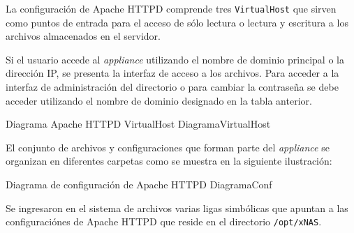 La configuraci\'{o}n de Apache \textsc{HTTPD} comprende tres \texttt{VirtualHost} que sirven como puntos de entrada para el acceso de s\'{o}lo lectura o lectura y escritura a los archivos almacenados en el servidor.

{
 \begin{table}[H]
 \caption{VirtualHost configurados en Apache \textsc{HTTPD}}{}
 \label{tab:virtualhost}
 \noindent{} %
 \end{table}
}

Si el usuario accede al \textit{appliance} utilizando el nombre de dominio principal o la direcci\'{o}n IP, se presenta la interfaz de acceso a los archivos. Para acceder a la interfaz de administraci\'{o}n del directorio o para cambiar la contrase\~{n}a se debe acceder utilizando el nombre de dominio designado en la tabla anterior.

\diagramblock
{Diagrama Apache \textsc{HTTPD} VirtualHost}
{DiagramaVirtualHost}
{
 {
  
 }
}

\newpage
El conjunto de archivos y configuraciones que forman parte del \textit{appliance} se organizan en diferentes carpetas como se muestra en la siguiente ilustraci\'{o}n:

\diagramblock
{Diagrama de configuraci\'{o}n de Apache \textsc{HTTPD}}
{DiagramaConf}
{
 {
  
 }
}

Se ingresaron en el sistema de archivos varias ligas simb\'{o}licas que apuntan a las configuraci\'{o}nes de Apache \textsc{HTTPD} que reside en el directorio \texttt{/opt/xNAS}.

